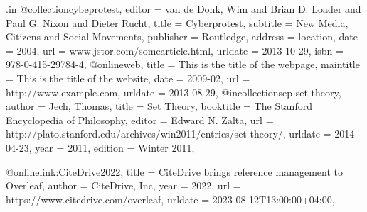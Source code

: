 \RequirePackage{filecontents}
\begin{filecontents*}{\jobname.in}
@collection{cybeprotest,
  editor    = {van de Donk, Wim and Brian D. Loader and Paul G. Nixon and Dieter Rucht},
  title     = {Cyberprotest},
  subtitle  = {New Media, Citizens and Social Movements},
  publisher = {Routledge},
  address   = {location},
  date      = {2004},
  url       = {www.jstor.com/somearticle.html},
  urldate   = {2013-10-29},
  isbn      = {978-0-415-29784-4},
}
@online{web,
  title     = {This is the title of the webpage},
  maintitle = {This is the title of the website},
  date      = {2009-02},
  url       = {http://www.example.com},
  urldate   = {2013-08-29},
}
@incollection{sep-set-theory,
  author       = {Jech, Thomas},
  title        = {Set Theory},
  booktitle    = {The Stanford Encyclopedia of Philosophy},
  editor       = {Edward N. Zalta},
  url          = {http://plato.stanford.edu/archives/win2011/entries/set-theory/},
  urldate      = {2014-04-23},
  year         = {2011},
  edition      = {Winter 2011},
}

@online{link:CiteDrive2022,
    title        = {CiteDrive brings reference management to Overleaf},
    author       = {CiteDrive, Inc},
    year         = 2022,
    url          = {https://www.citedrive.com/overleaf},
    urldate      = {2023-08-12T13:00:00+04:00},
}
\end{filecontents*}

\documentclass[11pt]{article}%
\usepackage[backend=biber,style=authoryear]{biblatex}
\usepackage{hyperref}






\section{Books}

